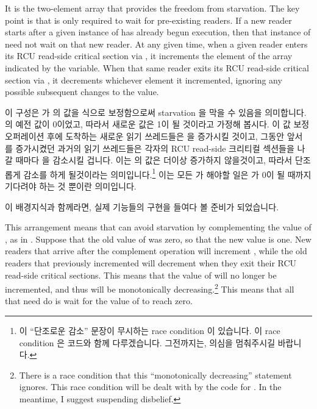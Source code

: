 It is the two-element  array that provides the freedom
from starvation.
The key point is that  is only required to wait
for pre-existing readers.
If a new reader starts after a given instance of 
has already begun execution, then that instance of 
need not wait on that new reader.
At any given time, when a given reader enters its RCU read-side critical
section via ,
it increments the element of the  array indicated by
the  variable.
When that same reader exits its RCU read-side critical section via
, it decrements whichever element it incremented,
ignoring any possible subsequent changes to the  value.
\fi

이 구성은  가  의 값을  식으로 보정함으로써 starvation 을 막을 수 있음을 의미합니다.
 의 예전 값이 0이었고, 따라서 새로운 값은 1이 될 것이라고 가정해
봅시다.
이 값 보정 오퍼레이션 후에 도착하는 새로운 읽기 쓰레드들은  을
증가시킬 것이고, 그동안 앞서  를 증가시켰던 과거의 읽기
쓰레드들은 각자의 RCU read-side 크리티컬 섹션들을 나갈 때마다 을
감소시킬 겁니다.
이는  의 값은 더이상 증가하지 않을것이고, 따라서 단조롭게 감소를
하게 될것이라는 의미입니다.\footnote{
	이 ``단조로운 감소'' 문장이 무시하는 race condition 이 있습니다.
	이 race condition 은  코드와 함께 다루겠습니다.
	그전까지는, 의심을 멈춰주시길 바랍니다.}
이는 모든  가 해야할 일은  가 0이 될
때까지 기다려야 하는 것 뿐이란 의미입니다.

이 배경지식과 함께라면, 실제 기능들의 구현을 들여다 볼 준비가 되었습니다.
\iffalse

This arrangement means that  can avoid starvation
by complementing the value of , as in .
Suppose that the old value of  was zero, so that the new
value is one.
New readers that arrive after the complement operation will increment
, while the old readers that previously incremented
 will decrement  when they exit their
RCU read-side critical sections.
This means that the value of  will no longer be incremented,
and thus will be monotonically decreasing.\footnote{
	There is a race condition that this ``monotonically decreasing''
	statement ignores.
	This race condition will be dealt with by the code for
	.
	In the meantime, I suggest suspending disbelief.}
This means that all that  need do is wait for the
value of  to reach zero.


